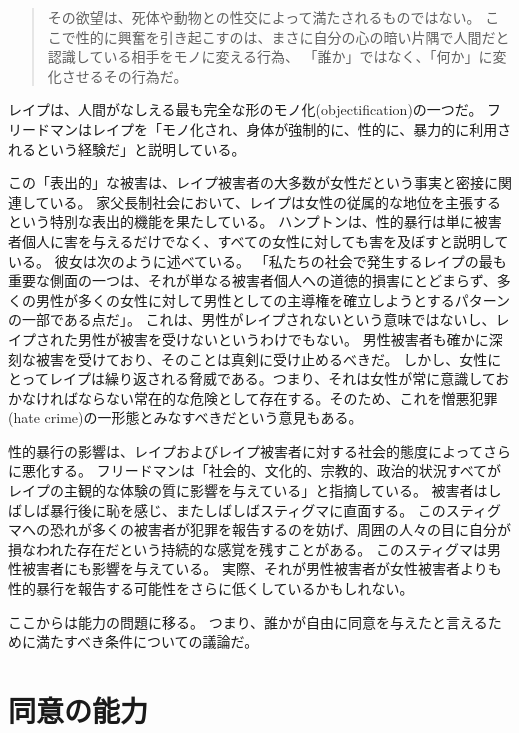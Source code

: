 \documentclass[paper=a4,book,openany]{jlreq}
\newcommand{\ig}[1]{}           %
\begin{document}
\begin{quote}
その欲望は、死体や動物との性交によって満たされるものではない。
ここで性的に興奮を引き起こすのは、まさに自分の心の暗い片隅で人間だと認識している相手をモノに変える行為、
「誰か」ではなく、「何か」に変化させるその行為だ。
\citep[p.281]{nussbaum95:_objec}
\end{quote}

レイプは、人間がなしえる最も完全な形のモノ化(objectification)の一つだ。
フリードマン\ig{Karyn L. Freedman}はレイプを「モノ化され、身体が強制的に、性的に、暴力的に利用されるという経験だ」と説明している。

この「表出的」な被害は、レイプ被害者の大多数が女性だという事実と密接に関連している。
家父長制社会において、レイプは女性の従属的な地位を主張するという特別な表出的機能を果たしている。
ハンプトンは、性的暴行は単に被害者個人に害を与えるだけでなく、すべての女性に対しても害を及ぼすと説明している。
彼女は次のように述べている。
「私たちの社会で発生するレイプの最も重要な側面の一つは、それが単なる被害者個人への道徳的損害にとどまらず、多くの男性が多くの女性に対して男性としての主導権を確立しようとするパターンの一部である点だ」\citep[p.135]{hampton99:_defin_wrong_and_defin_rape}。
これは、男性がレイプされないという意味ではないし、レイプされた男性が被害を受けないというわけでもない。
男性被害者も確かに深刻な被害を受けており、そのことは真剣に受け止めるべきだ。
しかし、女性にとってレイプは繰り返される脅威である。つまり、それは女性が常に意識しておかなければならない常在的な危険として存在する。そのため、これを憎悪犯罪(hate crime)の一形態とみなすべきだという意見もある\citep{campo-engelstein16:_rape_hate_crime}。

性的暴行の影響は、レイプおよびレイプ被害者に対する社会的態度によってさらに悪化する。
フリードマンは「社会的、文化的、宗教的、政治的状況すべてがレイプの主観的な体験の質に影響を与えている」と指摘している。
被害者はしばしば暴行後に恥を感じ、またしばしばスティグマに直面する。
このスティグマへの恐れが多くの被害者が犯罪を報告するのを妨げ、周囲の人々の目に自分が損なわれた存在だという持続的な感覚を残すことがある。
このスティグマは男性被害者にも影響を与えている。
実際、それが男性被害者が女性被害者よりも性的暴行を報告する可能性をさらに低くしているかもしれない\citep{mezey87:_male_victim_sexual_assaul}。

ここからは能力の問題に移る。
つまり、誰かが自由に同意を与えたと言えるために満たすべき条件についての議論だ。

\section{同意の能力}
\end{document}
